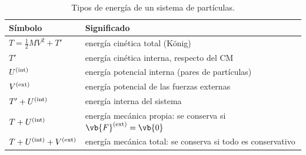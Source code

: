 \begin{table}[ht]
\centering
\caption{Tipos de energía de un sistema de partículas.}
\label{tab:energias}
\small
\begin{tabular}{@{}l l@{}}
\toprule
\color{cian}Símbolo & \color{cian}Significado\\
\midrule
$T=\tfrac12MV^{2}+T'$ & energía cinética total (König)\\
$T'$ & energía cinética interna, respecto del CM\\
$U^{(\mathrm{int})}$ & energía potencial interna (pares de partículas)\\
$V^{(\mathrm{ext})}$ & energía potencial de las fuerzas externas\\
$T'+U^{(\mathrm{int})}$ & energía interna del sistema\\
$T+U^{(\mathrm{int})}$ & energía mecánica propia: se conserva si $\vb{F}\ext=\vb{0}$\\
$T+U^{(\mathrm{int})}+V^{(\mathrm{ext})}$ & energía mecánica total: se conserva si todo es conservativo\\
\bottomrule
\end{tabular}
\end{table}

